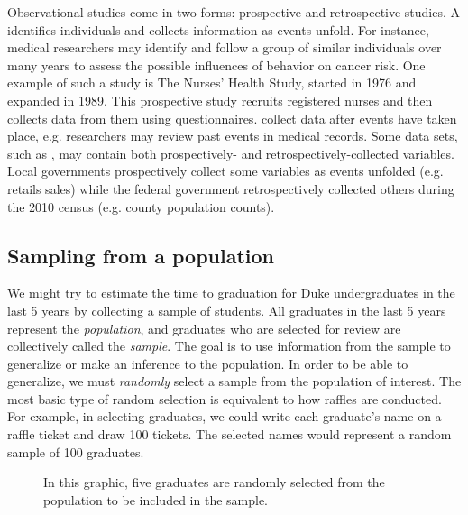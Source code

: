 Observational studies come in two forms: prospective and retrospective studies.
A  identifies individuals and collects information as
events unfold.
For instance, medical researchers may identify and follow a group of similar
individuals over many years to assess the possible influences of behavior on
cancer risk.
One example of such a study is The Nurses' Health Study, started in 1976
and expanded in 1989.
This prospective study recruits registered nurses and then collects data from
them using questionnaires.
 collect data after
events have taken place,
e.g. researchers may review past events in medical records.
Some data sets, such as , may contain both prospectively-
and retrospectively-collected variables.
Local governments prospectively collect some variables as events unfolded
(e.g. retails sales) while the federal government retrospectively collected
others during the 2010 census (e.g. county population counts).


\subsection{Sampling from a population}


We might try to estimate the time to graduation for Duke undergraduates in the last 5 years by collecting a sample of students. All graduates in the last 5 years represent the \emph{population}, and graduates who are selected for review are collectively called the \emph{sample}. The goal is to use information from the sample to generalize or make an inference to the population.  In order to be able to generalize, we must \emph{randomly} select a sample from the population of interest. The most basic type of random selection is equivalent to how raffles are conducted. For example, in selecting graduates, we could write each graduate's name on a raffle ticket and draw 100 tickets. The selected names would represent a random sample of 100 graduates.

\begin{figure}[ht]
\centering
\caption{In this graphic, five graduates are randomly selected from the population to be included in the sample.}
\label{popToSampleGraduates}
\end{figure}

